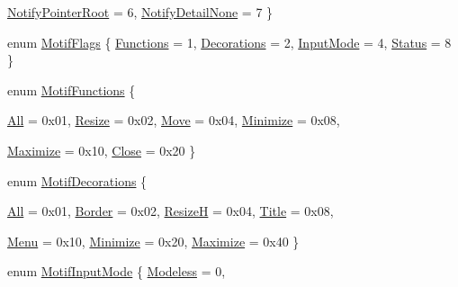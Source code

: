 \begin{DoxyCompactItemize}
\hyperlink{namespace_tao_1_1_platform_1_1_x11_a284f97dad97b4ca8dd1e16bd10eee70c}{NotifyPointerRoot} =  6, 
\hyperlink{namespace_tao_1_1_platform_1_1_x11_a284f97dad97b4ca8dd1e16bd10eee70c}{NotifyDetailNone} =  7
 \}
\item 
enum \hyperlink{namespace_tao_1_1_platform_1_1_x11_a52b518eacf7ec8c2b16f5152360ae8d7}{MotifFlags} \{ \hyperlink{namespace_tao_1_1_platform_1_1_x11_a52b518eacf7ec8c2b16f5152360ae8d7}{Functions} =  1, 
\hyperlink{namespace_tao_1_1_platform_1_1_x11_a52b518eacf7ec8c2b16f5152360ae8d7}{Decorations} =  2, 
\hyperlink{namespace_tao_1_1_platform_1_1_x11_a52b518eacf7ec8c2b16f5152360ae8d7}{InputMode} =  4, 
\hyperlink{namespace_tao_1_1_platform_1_1_x11_a52b518eacf7ec8c2b16f5152360ae8d7}{Status} =  8
 \}
\item 
enum \hyperlink{namespace_tao_1_1_platform_1_1_x11_a0b4eea080ceb02c10b458f7a9d95d726}{MotifFunctions} \{ \par
\hyperlink{namespace_tao_1_1_platform_1_1_x11_a0b4eea080ceb02c10b458f7a9d95d726}{All} =  0x01, 
\hyperlink{namespace_tao_1_1_platform_1_1_x11_a0b4eea080ceb02c10b458f7a9d95d726}{Resize} =  0x02, 
\hyperlink{namespace_tao_1_1_platform_1_1_x11_a0b4eea080ceb02c10b458f7a9d95d726}{Move} =  0x04, 
\hyperlink{namespace_tao_1_1_platform_1_1_x11_a0b4eea080ceb02c10b458f7a9d95d726}{Minimize} =  0x08, 
\par
\hyperlink{namespace_tao_1_1_platform_1_1_x11_a0b4eea080ceb02c10b458f7a9d95d726}{Maximize} =  0x10, 
\hyperlink{namespace_tao_1_1_platform_1_1_x11_a0b4eea080ceb02c10b458f7a9d95d726}{Close} =  0x20
 \}
\item 
enum \hyperlink{namespace_tao_1_1_platform_1_1_x11_a24316f63fb985b3f41d8e426aeb02a80}{MotifDecorations} \{ \par
\hyperlink{namespace_tao_1_1_platform_1_1_x11_a24316f63fb985b3f41d8e426aeb02a80}{All} =  0x01, 
\hyperlink{namespace_tao_1_1_platform_1_1_x11_a24316f63fb985b3f41d8e426aeb02a80}{Border} =  0x02, 
\hyperlink{namespace_tao_1_1_platform_1_1_x11_a24316f63fb985b3f41d8e426aeb02a80}{ResizeH} =  0x04, 
\hyperlink{namespace_tao_1_1_platform_1_1_x11_a24316f63fb985b3f41d8e426aeb02a80}{Title} =  0x08, 
\par
\hyperlink{namespace_tao_1_1_platform_1_1_x11_a24316f63fb985b3f41d8e426aeb02a80}{Menu} =  0x10, 
\hyperlink{namespace_tao_1_1_platform_1_1_x11_a24316f63fb985b3f41d8e426aeb02a80}{Minimize} =  0x20, 
\hyperlink{namespace_tao_1_1_platform_1_1_x11_a24316f63fb985b3f41d8e426aeb02a80}{Maximize} =  0x40
 \}
\item 
enum \hyperlink{namespace_tao_1_1_platform_1_1_x11_a8e24898f5a03698d6c8a39da5b2e88b6}{MotifInputMode} \{ \hyperlink{namespace_tao_1_1_platform_1_1_x11_a8e24898f5a03698d6c8a39da5b2e88b6}{Modeless} =  0, 

\end{DoxyCompactItemize}
